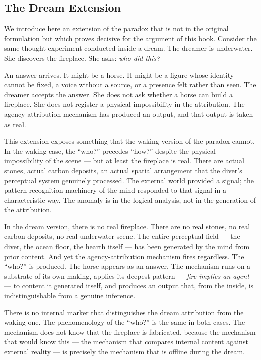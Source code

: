 \subsection{The Dream Extension}

We introduce here an extension of the paradox that is not in the original formulation but which proves decisive for the argument of this book. Consider the same thought experiment conducted inside a dream. The dreamer is underwater. She discovers the fireplace. She asks: \textit{who did this?}

An answer arrives. It might be a horse. It might be a figure whose identity cannot be fixed, a voice without a source, or a presence felt rather than seen. The dreamer accepts the answer. She does not ask whether a horse can build a fireplace. She does not register a physical impossibility in the attribution. The agency-attribution mechanism has produced an output, and that output is taken as real.

This extension exposes something that the waking version of the paradox cannot. In the waking case, the ``who?'' precedes ``how?'' despite the physical impossibility of the scene --- but at least the fireplace is real. There are actual stones, actual carbon deposits, an actual spatial arrangement that the diver's perceptual system genuinely processed. The external world provided a signal; the pattern-recognition machinery of the mind responded to that signal in a characteristic way. The anomaly is in the logical analysis, not in the generation of the attribution.

In the dream version, there is no real fireplace. There are no real stones, no real carbon deposits, no real underwater scene. The entire perceptual field --- the diver, the ocean floor, the hearth itself --- has been generated by the mind from prior content. And yet the agency-attribution mechanism fires regardless. The ``who?'' is produced. The horse appears as an answer. The mechanism runs on a substrate of its own making, applies its deepest pattern --- \textit{fire implies an agent} --- to content it generated itself, and produces an output that, from the inside, is indistinguishable from a genuine inference.

There is no internal marker that distinguishes the dream attribution from the waking one. The phenomenology of the ``who?'' is the same in both cases. The mechanism does not know that the fireplace is fabricated, because the mechanism that would know this --- the mechanism that compares internal content against external reality --- is precisely the mechanism that is offline during the dream.

